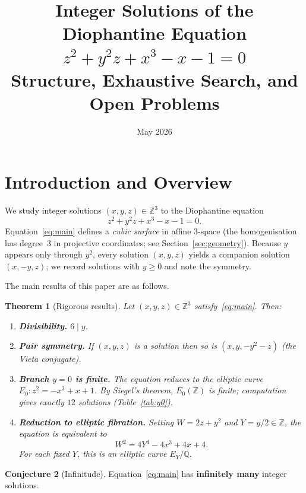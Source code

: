 \documentclass[12pt,a4paper]{article}
\title{\textbf{Integer Solutions of the Diophantine Equation}\\[4pt]
       $z^2 + y^2 z + x^3 - x - 1 = 0$\\[6pt]
       \large Structure, Exhaustive Search, and Open Problems}
\author{}
\date{May 2026}
\newtheorem{theorem}{Theorem}[section]
\theoremstyle{definition}
\newtheorem{conjecture}[theorem]{Conjecture}
\newcommand{\Z}{\mathbb{Z}}
\newcommand{\Q}{\mathbb{Q}}
\begin{document}
\maketitle
\tableofcontents

\section{Introduction and Overview}
\label{sec:intro}

We study integer solutions $(x,y,z)\in\Z^3$ to the Diophantine equation
\begin{equation}\label{eq:main}
  z^2 + y^2 z + x^3 - x - 1 = 0.
\end{equation}
Equation~\eqref{eq:main} defines a \emph{cubic surface} in affine $3$-space
(the homogenisation has degree~$3$ in projective coordinates; see
Section~\ref{sec:geometry}).  Because $y$ appears only through $y^2$, every
solution $(x,y,z)$ yields a companion solution $(x,-y,z)$; we record solutions
with $y\ge0$ and note the symmetry.

\medskip\noindent
The main results of this paper are as follows.

\begin{theorem}[Rigorous results]\label{thm:rigorous}
  Let $(x,y,z)\in\Z^3$ satisfy~\eqref{eq:main}.  Then:
  \begin{enumerate}[label=(\roman*)]
    \item \textbf{Divisibility.}  $6\mid y$.
    \item \textbf{Pair symmetry.}  If $(x,y,z)$ is a solution then so is
          $(x,y,-y^2-z)$ (the Vieta conjugate).
    \item \textbf{Branch $y=0$ is finite.}  The equation reduces to the
          elliptic curve $E_0: z^2 = -x^3+x+1$.  By Siegel's theorem,
          $E_0(\Z)$ is finite; computation gives exactly $12$ solutions
          (Table~\ref{tab:y0}).
    \item \textbf{Reduction to elliptic fibration.}  Setting $W = 2z+y^2$
          and $Y = y/2\in\Z$, the equation is equivalent to
          \[
            W^2 = 4Y^4 - 4x^3 + 4x + 4.
          \]
          For each fixed $Y$, this is an elliptic curve $E_Y/\Q$.
  \end{enumerate}
\end{theorem}

\begin{conjecture}[Infinitude]\label{conj:infinite}
  Equation~\eqref{eq:main} has \textbf{infinitely many} integer solutions.
\end{conjecture}
\end{document}

